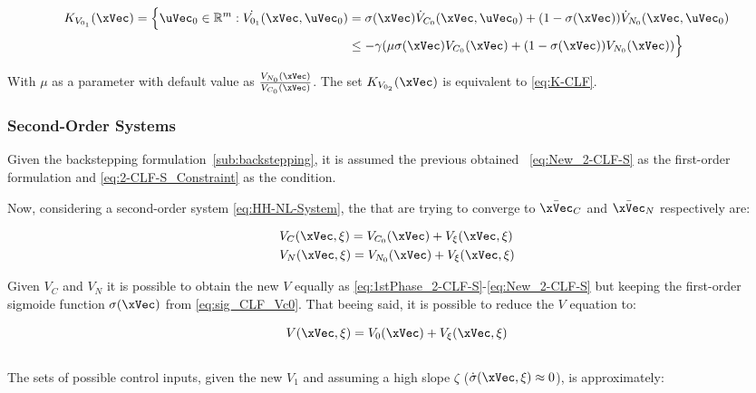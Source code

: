\begin{align}
    K_{V_{0_1}}(\xVec) = \Bigl\{\uVec_0 \in \mathbb{R}^m: \dot{V_{0_1}}(\xVec, \uVec_0) &= \sigma(\xVec) \dot{V}_{C_0}(\xVec, \uVec_0)  + (1-\sigma(\xVec))\dot{V}_{N_0}(\xVec, \uVec_0) \notag \\
    &\leq -\gamma( \mu \sigma(\xVec) V_{C_0}(\xVec) + (1 - \sigma(\xVec))V_{N_0}(\xVec)  )\Bigr\}
    \label{eq:2-CLF-S_Constraint}
\end{align}

With \(\mu\) as a parameter with default value as \( \frac{V_{N_0}(\xVec)}{V_{C_0}(\xVec)} \). The set \(K_{V_{0_2}}(\xVec)\) is equivalent to \eqref{eq:K-CLF}. \\

\subsubsection{Second-Order Systems}
\label{subsubsubsec:CLFs_Summed_Algorithm_2nd_order}

Given the backstepping formulation~\ref{sub:backstepping}, it is assumed the previous obtained ~\eqref{eq:New_2-CLF-S} as the first-order formulation and \eqref{eq:2-CLF-S_Constraint} as the condition.\par 
Now, considering a second-order system \eqref{eq:HH-NL-System}, the  that are trying to converge to \(\bar{\xVec}_C\) and  \(\bar{\xVec}_N\) respectively are:


\begin{align}
    &V_C(\xVec, \xi) = V_{C_0}(\xVec) + V_{\xi}(\xVec, \xi) \label{eq:hh_current_clf}\\
    &V_N(\xVec, \xi) = V_{N_0}(\xVec) + V_{\xi}(\xVec, \xi) \label{eq:hh_next_clf}
\end{align}

Given \(V_C\) and \(V_N\) it is possible to obtain the new  \(V\) equally as \eqref{eq:1stPhase_2-CLF-S}-\eqref{eq:New_2-CLF-S} but keeping the first-order sigmoide function \(\sigma(\xVec)\) from \eqref{eq:sig_CLF_Vc0}. That beeing said, it is possible to reduce the  \(V\) equation to:

\begin{equation}
    V(\xVec, \xi) = V_0(\xVec) + V_{\xi}(\xVec, \xi)
    \label{eq:HH_New_2-CLF-S}
\end{equation}\\

The sets of possible control inputs, given the new  \(V_{1}\) and assuming a high slope \(\zeta\) (\(\dot{\sigma}(\xVec, \xi)\approx 0\)), is approximately:



